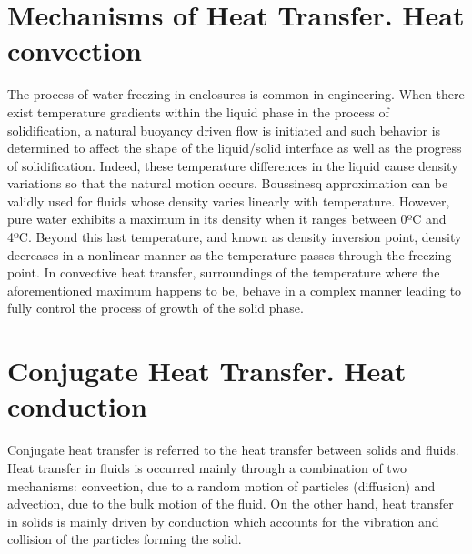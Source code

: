 \section{Mechanisms of Heat Transfer. Heat convection}
The process of water freezing in enclosures is common in engineering. When there exist temperature gradients within the liquid phase in the process of solidification, a natural buoyancy driven flow is initiated and such behavior is determined to affect the shape of the liquid/solid interface as well as the progress of solidification.
\newline
Indeed, these temperature differences in the liquid cause density variations so that the natural motion occurs. Boussinesq approximation can be validly used for fluids whose density varies linearly with temperature. However, pure water exhibits a maximum in its density when it ranges between 0ºC and 4ºC. Beyond this last temperature, and known as density inversion point, density decreases in a nonlinear manner as the temperature passes through the freezing point. In convective heat transfer, surroundings of the temperature where the aforementioned maximum happens to be, behave in a complex manner leading to fully control the process of growth of the solid phase.
\newline
\section{Conjugate Heat Transfer. Heat conduction}
Conjugate heat transfer is referred to the heat transfer between solids and fluids. Heat transfer in fluids is occurred mainly through a combination of two mechanisms: convection, due to a random motion of particles (diffusion) and advection, due to the bulk motion of the fluid. On the other hand, heat transfer in solids is mainly driven by conduction which accounts for the vibration and collision of the particles forming the solid.


%
%

